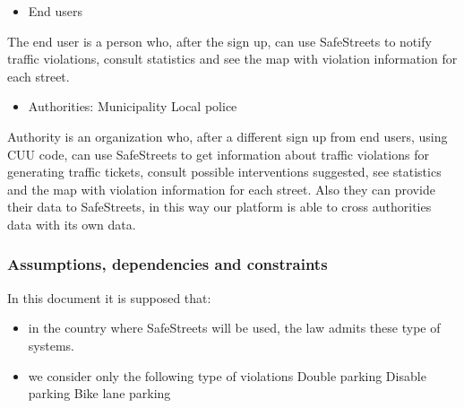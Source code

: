 \begin{itemize}
	\item End users
\end{itemize}

The end user is a person who, after the sign up, can use SafeStreets to notify traffic violations, consult statistics and see the map with violation information for each street.

\begin{itemize}
	\item Authorities:
	\subitem Municipality
	\subitem Local police
\end{itemize}


Authority is an organization who, after a different sign up from end users, using CUU code, can use SafeStreets to get information about traffic violations for generating traffic tickets, consult possible interventions suggested, see statistics and the map with violation information for each street.
Also they can provide their data to SafeStreets, in this way our platform is able to cross authorities data with its own data.

\subsubsection{Assumptions, dependencies and constraints}
	In this document it is supposed that:
\begin{itemize}
	\item 
	in the country where SafeStreets will be used, the law admits these type of systems.
	
	\item 
	we consider only the following type of violations
	\subitem
	Double parking
	\subitem
	Disable parking
	\subitem
	Bike lane parking
\end{itemize}



